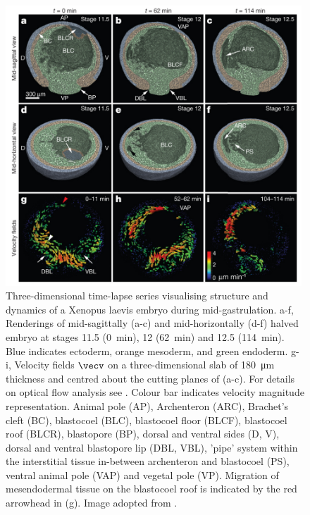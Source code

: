 \documentclass[
twoside,
openright,
titlepage,
numbers=noenddot,
headinclude,
fleqn,
a4paper,
footinclude=true,
cleardoublepage=empty,
abstractoff,
BCOR=5mm,
paper=a4,
fontsize=11pt,
british,ngerman,american,
]{scrreprt}
\begin{document}

\begin{figure}
  \centering
  \includegraphics[width=0.99\textwidth]{figures/Nature/Fig-2.jpg}
  \caption[3D time-lapse series visualising structure and dynamics of
  Xenopus laevis embryo during mid-gastrulation.]{%
    Three-dimensional time-lapse series visualising structure and
    dynamics of a Xenopus laevis embryo during mid-gastrulation. a-f,
    Renderings of mid-sagittally (a-c) and mid-horizontally (d-f)
    halved embryo at stages 11.5 (\SI{0}{min}), 12 (\SI{62}{min}) and
    12.5 (\SI{114}{min}).  Blue indicates ectoderm, orange mesoderm,
    and green endoderm.  g-i, Velocity fields $\vecv$ on a
    three-dimensional slab of \SI{180}{\micro m} thickness and centred
    about the cutting planes of (a-c).  For details on optical flow
    analysis see \cite{Moosmann2013nature,Moosmann2014natp}.  Colour
    bar indicates velocity magnitude representation.  Animal pole
    (AP), Archenteron (ARC), Brachet's cleft (BC), blastocoel (BLC),
    blastocoel floor (BLCF), blastocoel roof (BLCR), blastopore (BP),
    dorsal and ventral sides (D, V), dorsal and ventral blastopore lip
    (DBL, VBL), 'pipe' system within the interstitial tissue
    in-between archenteron and blastocoel (PS), ventral animal pole
    (VAP) and vegetal pole (VP).  Migration of mesendodermal tissue on
    the blastocoel roof is indicated by the red arrowhead in (g).
    Image adopted from \cite{Moosmann2013nature}.}
  \label{fig:bio-2}
\end{figure}
\end{document}
